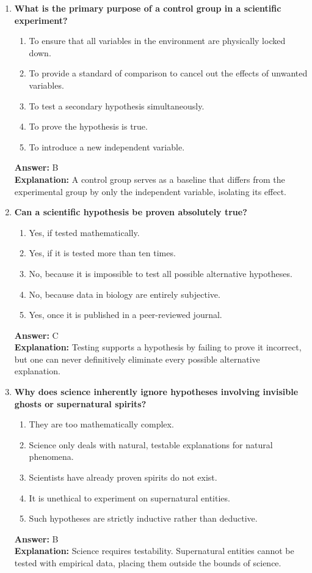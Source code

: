 \documentclass[11pt, a4paper]{article}
\begin{document}
\begin{enumerate}
\item \textbf{What is the primary purpose of a control group in a scientific experiment?}
\begin{enumerate}[label=\Alph*.]
    \item To ensure that all variables in the environment are physically locked down.
    \item To provide a standard of comparison to cancel out the effects of unwanted variables.
    \item To test a secondary hypothesis simultaneously.
    \item To prove the hypothesis is true.
    \item To introduce a new independent variable.
\end{enumerate}
\textbf{Answer:} B \\
\textbf{Explanation:} A control group serves as a baseline that differs from the experimental group by only the independent variable, isolating its effect.

\item \textbf{Can a scientific hypothesis be proven absolutely true?}
\begin{enumerate}[label=\Alph*.]
    \item Yes, if tested mathematically.
    \item Yes, if it is tested more than ten times.
    \item No, because it is impossible to test all possible alternative hypotheses.
    \item No, because data in biology are entirely subjective.
    \item Yes, once it is published in a peer-reviewed journal.
\end{enumerate}
\textbf{Answer:} C \\
\textbf{Explanation:} Testing supports a hypothesis by failing to prove it incorrect, but one can never definitively eliminate every possible alternative explanation.

\item \textbf{Why does science inherently ignore hypotheses involving invisible ghosts or supernatural spirits?}
\begin{enumerate}[label=\Alph*.]
    \item They are too mathematically complex.
    \item Science only deals with natural, testable explanations for natural phenomena.
    \item Scientists have already proven spirits do not exist.
    \item It is unethical to experiment on supernatural entities.
    \item Such hypotheses are strictly inductive rather than deductive.
\end{enumerate}
\textbf{Answer:} B \\
\textbf{Explanation:} Science requires testability. Supernatural entities cannot be tested with empirical data, placing them outside the bounds of science.


\end{enumerate}
\end{document}

